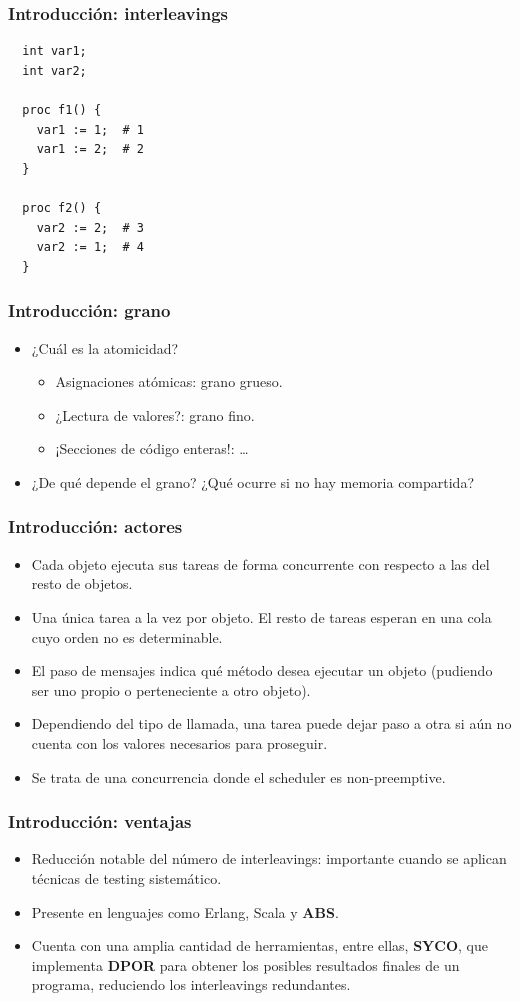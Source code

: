\documentclass[spanish, a4paper, 12pt, final, slideColor, nototal, colorBG, pdf, noaccumulate, darkblue] {beamer}
\begin{document}
\begin{frame}[fragile]
  \frametitle{Introducción: interleavings}
  \begin{lstlisting}
  int var1;
  int var2;

  proc f1() {
    var1 := 1;  # 1
    var1 := 2;  # 2
  }

  proc f2() {
    var2 := 2;  # 3
    var2 := 1;  # 4
  }
  \end{lstlisting}
\end{frame}

\begin{frame}
  \frametitle{Introducción: grano}
  \begin{itemize}
  \item ¿Cuál es la atomicidad?
    \begin{itemize}
    \item Asignaciones atómicas: grano grueso.
    \item ¿Lectura de valores?: grano fino.
    \item ¡Secciones de código enteras!: \dots
    \end{itemize}
  \item ¿De qué depende el grano? ¿Qué ocurre si no hay memoria compartida?
  \end{itemize}
\end{frame}

\begin{frame}
  \frametitle{Introducción: actores}
  \begin{itemize}
  \item Cada objeto ejecuta sus tareas de forma concurrente con respecto a las del resto de objetos.
  \item Una única tarea a la vez por objeto. El resto de tareas esperan en una cola cuyo orden no es determinable.
  \item El paso de mensajes indica qué método desea ejecutar un objeto (pudiendo ser uno propio o perteneciente a otro objeto).
  \item Dependiendo del tipo de llamada, una tarea puede dejar paso a otra si aún no cuenta con los valores necesarios para proseguir.
  \item Se trata de una concurrencia donde el scheduler es non-preemptive.
  \end{itemize}
\end{frame}

\begin{frame}
  \frametitle{Introducción: ventajas}
  \begin{itemize}
  \item Reducción notable del número de interleavings: importante cuando se aplican técnicas de testing sistemático.
  \item Presente en lenguajes como Erlang, Scala y \textbf{ABS}.
  \item Cuenta con una amplia cantidad de herramientas, entre ellas, \textbf{SYCO}, que implementa \textbf{DPOR} para obtener los posibles resultados finales de un programa, reduciendo los interleavings redundantes.
  \end{itemize}
\end{frame}
\end{document}
